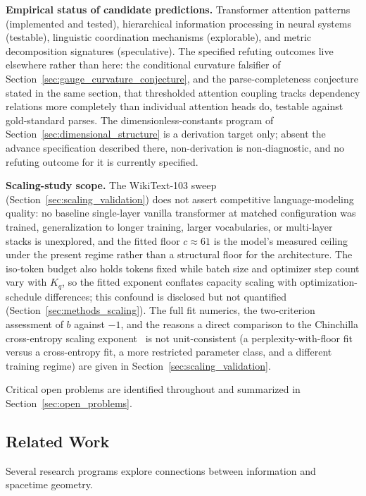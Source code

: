 \documentclass[11pt]{article}
\begin{document}
\textbf{Empirical status of candidate predictions.} Transformer attention patterns (implemented and tested), hierarchical information processing in neural systems (testable), linguistic coordination mechanisms (explorable), and metric decomposition signatures (speculative). The specified refuting outcomes live elsewhere rather than here: the conditional curvature falsifier of Section~\ref{sec:gauge_curvature_conjecture}, and the parse-completeness conjecture stated in the same section, that thresholded attention coupling tracks dependency relations more completely than individual attention heads do, testable against gold-standard parses. The dimensionless-constants program of Section~\ref{sec:dimensional_structure} is a derivation target only; absent the advance specification described there, non-derivation is non-diagnostic, and no refuting outcome for it is currently specified.

\textbf{Scaling-study scope.} The WikiText-103 sweep (Section~\ref{sec:scaling_validation}) does not assert competitive language-modeling quality: no baseline single-layer vanilla transformer at matched configuration was trained, generalization to longer training, larger vocabularies, or multi-layer stacks is unexplored, and the fitted floor $c \approx 61$ is the model's measured ceiling under the present regime rather than a structural floor for the architecture. The iso-token budget also holds tokens fixed while batch size and optimizer step count vary with $K_q$, so the fitted exponent conflates capacity scaling with optimization-schedule differences; this confound is disclosed but not quantified (Section~\ref{sec:methods_scaling}). The full fit numerics, the two-criterion assessment of $b$ against $-1$, and the reasons a direct comparison to the Chinchilla cross-entropy scaling exponent~\cite{HoffmannChinchilla2022} is not unit-consistent (a perplexity-with-floor fit versus a cross-entropy fit, a more restricted parameter class, and a different training regime) are given in Section~\ref{sec:scaling_validation}.

Critical open problems are identified throughout and summarized in Section~\ref{sec:open_problems}.

\subsection{Related Work}

Several research programs explore connections between information and spacetime geometry.
\end{document}
